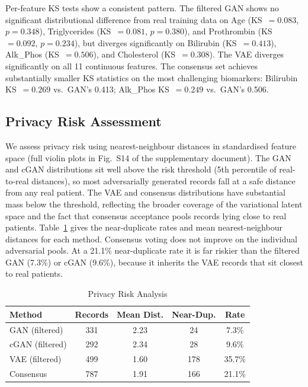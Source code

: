 \documentclass[journal]{IEEEtran}
\begin{document}
Per-feature KS tests show a consistent pattern. The filtered GAN shows no significant distributional difference from real training data on Age (KS~$= 0.083$, $p = 0.348$), Triglycerides (KS~$= 0.081$, $p = 0.380$), and Prothrombin (KS~$= 0.092$, $p = 0.234$), but diverges significantly on Bilirubin (KS~$= 0.413$), Alk\_Phos (KS~$= 0.506$), and Cholesterol (KS~$= 0.308$). The VAE diverges significantly on all 11 continuous features. The consensus set achieves substantially smaller KS statistics on the most challenging biomarkers: Bilirubin KS~$= 0.269$ vs.\ GAN's 0.413; Alk\_Phos KS~$= 0.249$ vs.\ GAN's 0.506.

\subsection{Privacy Risk Assessment}

We assess privacy risk using nearest-neighbour distances in standardised feature space (full violin plots in Fig.~S14 of the supplementary document). The GAN and cGAN distributions sit well above the risk threshold (5th percentile of real-to-real distances), so most adversarially generated records fall at a safe distance from any real patient. The VAE and consensus distributions have substantial mass below the threshold, reflecting the broader coverage of the variational latent space and the fact that consensus acceptance pools records lying close to real patients. Table~\ref{tab:privacy} gives the near-duplicate rates and mean nearest-neighbour distances for each method. Consensus voting does not improve on the individual adversarial pools. At a 21.1\% near-duplicate rate it is far riskier than the filtered GAN (7.3\%) or cGAN (9.6\%), because it inherits the VAE records that sit closest to real patients.

\begin{table}[!tb]
  \centering
  \caption{Privacy Risk Analysis}
  \label{tab:privacy}
  \begin{tabular}{lcccc}
    \toprule
    Method & Records & Mean Dist. & Near-Dup. & Rate \\
    \midrule
    GAN (filtered)   & 331 & 2.23 & 24  & 7.3\%  \\
    cGAN (filtered) & 292 & 2.34 & 28  & 9.6\%  \\
    VAE (filtered)  & 499 & 1.60 & 178 & 35.7\% \\
    Consensus        & 787 & 1.91 & 166 & 21.1\% \\
    \bottomrule
  \end{tabular}
\end{table}
\end{document}
